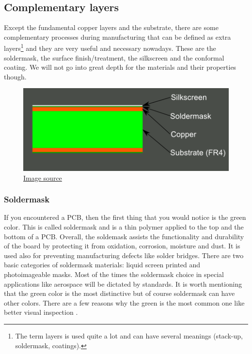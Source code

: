 \documentclass[final]{cubedoc}
\begin{document}
	
	\subsection{Complementary layers}
	\label{subsec:complementary}
	
	Except the fundamental copper layers and the substrate, there are some complementary processes during manufacturing that can be defined as extra layers\footnote{The term layers is used quite a lot and can have several meanings (stack-up, soldermask, coatings).} and they are very useful and necessary nowadays. These are the soldermask, the surface finish/treatment, the silkscreen and the conformal coating. We will not go into great depth for the materials and their properties though.
	
	\begin{figure}[h!]
		\centering
		\centering
		\includegraphics[keepaspectratio, height=0.25\textheight, width=.6\textwidth]{assets/2_layer_plus_silkscreen.png}
		\caption{\href{https://web.archive.org/web/20200814083524/https://learn.sparkfun.com/tutorials/using-eagle-board-layout/all}{Image source}}
	\end{figure}
	
	
	
	\subsubsection{Soldermask}
	
	If you encountered a PCB, then the first thing that you would notice is the green color. This is called soldermask and is a thin polymer applied to the top and the bottom of a PCB. Overall, the soldemask assists the functionality and durability of the board by protecting it from oxidation, corrosion, moisture and dust. It is used also for preventing manufacturing defects like solder bridges.  There are two basic categories of soldermask materials: liquid screen printed and photoimageable masks. Most of the times the soldermask choice in special applications like aerospace will be dictated by standards. It is worth mentioning that the green color is the most distinctive but of course soldermask can have other colors. There are a few reasons why the green is the most common one like better visual inspection \cite{mitzner2011complete}.
	
\end{document}
